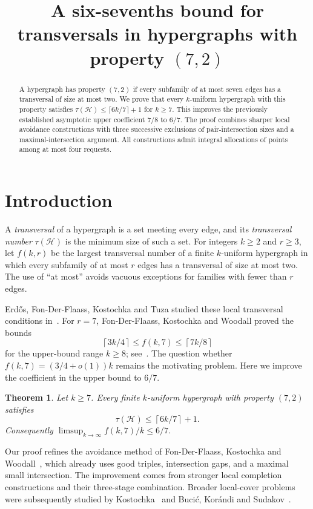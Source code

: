 \documentclass[11pt]{article}
\title{A six-sevenths bound for transversals in hypergraphs with property $(7,2)$}
\author{}
\date{}
\numberwithin{equation}{section}
\newtheorem{theorem}{Theorem}[section]
\theoremstyle{definition}
\theoremstyle{remark}
\newcommand{\HH}{\mathcal H}
\newcommand{\ceil}[1]{\left\lceil #1\right\rceil}
\begin{document}
\maketitle
\begin{abstract}
A hypergraph has property $(7,2)$ if every subfamily of at most seven
edges has a transversal of size at most two. We prove that every
$k$-uniform hypergraph with this property satisfies
$\tau(\HH)\le\lceil6k/7\rceil+1$ for $k\ge7$.
This improves the previously established asymptotic upper coefficient
$7/8$ to $6/7$. The proof combines sharper local avoidance constructions
with three successive exclusions of pair-intersection sizes and a
maximal-intersection argument. All constructions admit integral
allocations of points among at most four requests.
\end{abstract}

\section{Introduction}
A \emph{transversal} of a hypergraph is a set meeting every edge, and its
\emph{transversal number} $\tau(\HH)$ is the minimum size of such a set.
For integers $k\ge2$ and $r\ge3$, let $f(k,r)$ be the largest transversal
number of a finite $k$-uniform hypergraph in which every subfamily of at
most $r$ edges has a transversal of size at most two. The use of ``at most''
avoids vacuous exceptions for families with fewer than $r$ edges.

Erd\H{o}s, Fon-Der-Flaass, Kostochka and Tuza studied these local
transversal conditions in~\cite{EFKT}. For $r=7$, Fon-Der-Flaass,
Kostochka and Woodall proved the bounds
\[
 \ceil{3k/4}\le f(k,7)\le\ceil{7k/8}
\]
for the upper-bound range $k\ge8$; see~\cite{FKW}.
The question whether $f(k,7)=(3/4+o(1))k$ remains the motivating problem.
Here we improve the coefficient in the upper bound to $6/7$.

\begin{theorem}\label{thm:main}
Let $k\ge7$. Every finite $k$-uniform hypergraph with property $(7,2)$
satisfies
\[
 \tau(\HH)\le\ceil{6k/7}+1.
\]
Consequently $\limsup_{k\to\infty}f(k,7)/k\le6/7$.
\end{theorem}

Our proof refines the avoidance method of Fon-Der-Flaass, Kostochka
and Woodall~\cite{FKW}, which already uses good triples, intersection
gaps, and a maximal small intersection. The improvement comes from
stronger local completion constructions and their three-stage
combination. Broader local-cover problems were subsequently studied
by Kostochka~\cite{Kostochka} and Buci\'c, Kor\'andi and Sudakov~\cite{BKS}.
\end{document}

